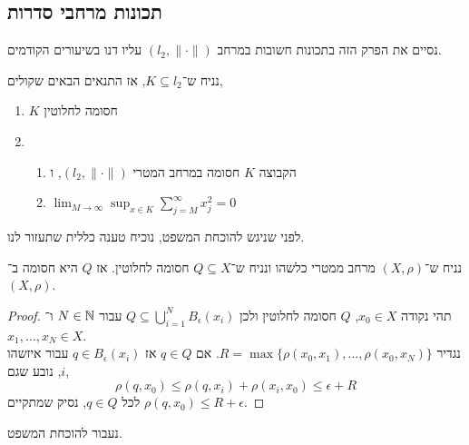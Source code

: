 \subsection{תכונות מרחבי סדרות}
נסיים את הפרק הזה בתכונות חשובות במרחב $(l_2, \lVert \cdot \rVert)$ עליו דנו בשיעורים הקודמים.
\begin{theorem}
	נניח ש־$K \subseteq l_2$, אז התנאים הבאים שקולים,
	\begin{enumerate}
		\item $K$ חסומה לחלוטין
		\item
			\begin{enumerate}
				\item הקבוצה $K$ חסומה במרחב המטרי $(l_2, \lVert \cdot \rVert)$, ו
				\item $\lim_{M \to \infty} \sup_{x \in K} \sum_{j = M}^\infty x_j^2 = 0$
			\end{enumerate}
	\end{enumerate}
\end{theorem}
לפני שניגש להוכחת המשפט, נוכיח טענה כללית שתעזור לנו.
\begin{proposition}
	נניח ש־$(X, \rho)$ מרחב ממטרי כלשהו ונניח ש־$Q \subseteq X$ חסומה לחלוטין.
	אז $Q$ היא חסומה ב־$(X, \rho)$.
\end{proposition}
\begin{proof}
	תהי נקודה $x_0 \in X$, $Q$ חסומה לחלוטין ולכן $Q \subseteq \bigcup_{i = 1}^N B_{\epsilon}(x_i)$ עבור $N \in \mathbb{N}$ ו־$x_1, \ldots, x_N \in X$. \\
	נגדיר $R = \max\{ \rho(x_0, x_1), \ldots, \rho(x_0, x_N) \}$.
	אם $q \in Q$ אז $q \in B_{\epsilon}(x_i)$ עבור איזשהו $i$, נובע שגם,
	\[
		\rho(q, x_0)
		\le \rho(q, x_i) + \rho(x_i, x_0)
		\le \epsilon + R
	\] 
	לכל $q \in Q$, נסיק שמתקיים $\rho(q, x_0) \le R + \epsilon$.
\end{proof}
נעבור להוכחת המשפט.
